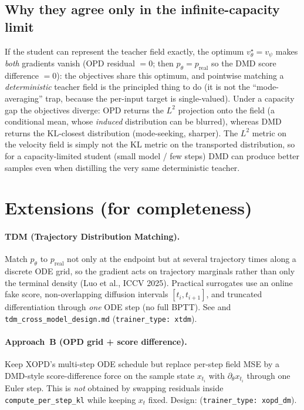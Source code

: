 \documentclass[11pt,a4paper]{article}
\newcommand{\KL}{\mathrm{KL}}
\newcommand{\real}{\mathrm{real}}
\begin{document}
\subsection{Why they agree only in the infinite-capacity limit}
If the student can represent the teacher field exactly, the optimum $v_\theta^\star=v_\psi$ makes
\emph{both} gradients vanish (OPD residual $=0$; then $p_\theta=p_{\real}$ so the DMD score
difference $=0$): the objectives share this optimum, and pointwise matching a \emph{deterministic}
teacher field is the principled thing to do (it is not the ``mode-averaging'' trap, because the
per-input target is single-valued). Under a capacity gap the objectives diverge: OPD returns the
$L^2$ projection onto the field (a conditional mean, whose \emph{induced} distribution can be
blurred), whereas DMD returns the $\KL$-closest distribution (mode-seeking, sharper). The $L^2$
metric on the velocity field is simply not the $\KL$ metric on the transported distribution, so for
a capacity-limited student (small model / few steps) DMD can produce better samples even when
distilling the very same deterministic teacher.

\section{Extensions (for completeness)}
\paragraph{TDM (Trajectory Distribution Matching).} Match $p_\theta$ to $p_{\real}$ not only at the
endpoint but at several trajectory times along a discrete ODE grid, so the gradient acts on
trajectory marginals rather than only the terminal density (Luo et al., ICCV 2025). Practical
surrogates use an online fake score, non-overlapping diffusion intervals $[t_i,t_{i+1}]$, and
truncated differentiation through \emph{one} ODE step (no full BPTT). See
 and \texttt{tdm\_cross\_model\_design.md}
(\texttt{trainer\_type: xtdm}).
\paragraph{Approach~B (OPD grid + score difference).} Keep XOPD's multi-step ODE schedule but
replace per-step field MSE by a DMD-style score-difference force on the sample state $x_{t_i}$
with $\partial_\theta x_{t_i}$ through one Euler step. This is \emph{not} obtained by swapping
residuals inside \texttt{compute\_per\_step\_kl} while keeping $x_t$ fixed. Design:
 (\texttt{trainer\_type: xopd\_dm}).
\end{document}
